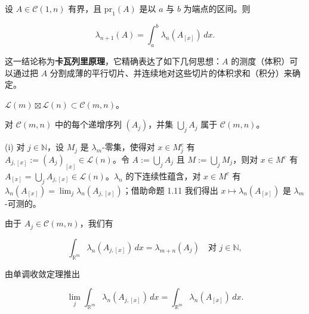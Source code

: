 \begin{remark}

\begin{items}
\item

设 $ A \in \mathcal{C}(1, n) $ 有界，且 $ \mathrm{pr}_1(A) $ 是以 $ a $ 与 $ b $ 为端点的区间。则

\[
\lambda_{n+1}(A) = \int_{a}^{b} \lambda_n(A_{[x]}) \, dx .
\]

这一结论称为\textbf{卡瓦列里原理}，它精确表达了如下几何思想：$ A $ 的测度（体积）可以通过把 $ A $ 分割成薄的平行切片、并连续地对这些切片的体积求和（积分）来确定。

\end{items}


\begin{items}
\item[（b）]

$ \mathcal{L}(m) \boxtimes \mathcal{L}(n) \subset \mathcal{C}(m, n) $。

\item[（c）]

对 $ \mathcal{C}(m, n) $ 中的每个递增序列 $ (A_j) $，并集 $ \bigcup_j A_j $ 属于 $ \mathcal{C}(m, n) $。

\begin{subitems}
\item

\proofhead
(i) 对 $ j \in \mathbb{N} $，设 $ M_j $ 是 $ \lambda_m $-零集，使得对 $ x \in M_j^{c} $ 有 $ A_{j,[x]} := (A_j)_{[x]} \in \mathcal{L}(n) $。令 $ A := \bigcup_j A_j $ 且 $ M := \bigcup_j M_j $，则对 $ x \in M^{c} $ 有 $ A_{[x]} = \bigcup_j A_{j,[x]} \in \mathcal{L}(n) $。$ \lambda_n $ 的下连续性蕴含，对 $ x \in M^{c} $ 有 $ \lambda_n(A_{[x]}) = \lim_j \lambda_n(A_{j,[x]}) $；借助命题 1.11 我们得出 $ x \mapsto \lambda_n(A_{[x]}) $ 是 $ \lambda_m $-可测的。
\item

由于 $ A_j \in \mathcal{C}(m, n) $，我们有

\[
\int_{\mathbb{R}^m} \lambda_n(A_{j,[x]}) \, dx = \lambda_{m+n}(A_j) \quad \text{对 } j \in \mathbb{N} ,
\]

由单调收敛定理推出

\begin{equation}
\lim_j \int_{\mathbb{R}^m} \lambda_n(A_{j,[x]}) \, dx = \int_{\mathbb{R}^m} \lambda_n(A_{[x]}) \, dx .\tag{6.2}
\end{equation}


\end{subitems}
\end{items}
\end{remark}
